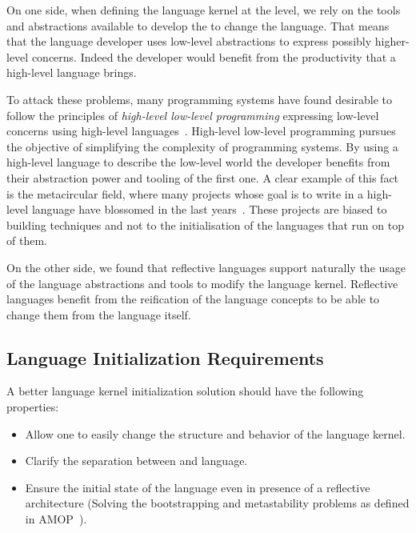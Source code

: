 On one side, when defining the language kernel at the \VM level, we rely on the tools and abstractions available to develop the \VM to change the language. That means that the language developer uses low-level abstractions to express possibly higher-level concerns. Indeed the developer would benefit from the productivity that a high-level language brings.

To attack these problems, many programming systems have found desirable to follow the principles of \emph{high-level low-level programming} \ie expressing low-level concerns using high-level languages~\cite{Fram09a}. High-level low-level programming pursues the objective of simplifying the complexity of programming systems. By using a high-level language to describe the low-level world the developer benefits from their abstraction power and tooling of the first one. A clear example of this fact is the metacircular \VM field, where many projects whose goal is to write \VMs in a high-level language have blossomed in the last years~\cite{Wimm13a,Alpe00a,Verw11a,Inga97a,Unga05a,Rigo06a}. These projects are biased to \VM building techniques and not to the initialisation of the languages that run on top of them. %



On the other side, we found that reflective languages support naturally the usage of the language abstractions and tools to modify the language kernel. Reflective languages benefit from the reification of the language concepts to be able to change them from the language itself.

\subsection{Language Initialization Requirements}

A better language kernel initialization solution should have the following properties:
\begin{itemize}
\item Allow one to easily change the structure and behavior of the language kernel.
\item Clarify the separation between \VM and language.
\item Ensure the initial state of the language even in presence of a reflective architecture (Solving the bootstrapping and metastability problems as defined in AMOP~\cite{Kicz91a}).
\end{itemize}

